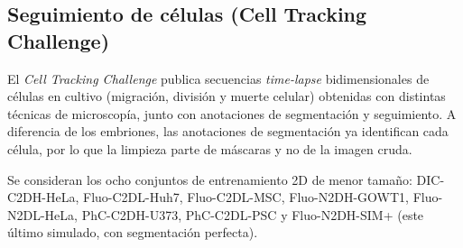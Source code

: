 \subsection{Seguimiento de células (Cell Tracking Challenge)}\label{sec:exp2_ctc}

El \textit{Cell Tracking Challenge} publica secuencias \textit{time-lapse} bidimensionales de células en cultivo (migración, división y muerte celular) obtenidas con distintas técnicas de microscopía, junto con anotaciones de segmentación y seguimiento. A diferencia de los embriones, las anotaciones de segmentación ya identifican cada célula, por lo que la limpieza parte de máscaras y no de la imagen cruda.

Se consideran los ocho conjuntos de entrenamiento 2D de menor tamaño: DIC-C2DH-HeLa, Fluo-C2DL-Huh7, Fluo-C2DL-MSC, Fluo-N2DH-GOWT1, Fluo-N2DL-HeLa, PhC-C2DH-U373, PhC-C2DL-PSC y Fluo-N2DH-SIM+ (este último simulado, con segmentación perfecta).



